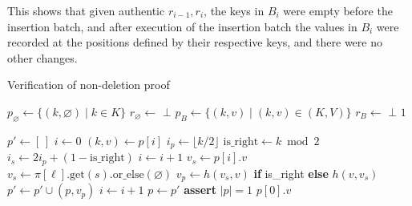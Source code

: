 \documentclass[twocolumn]{article}
\begin{document}
This shows that given authentic $r_{i-1}, r_i$, the keys in $B_i$ were empty before the insertion batch, and after execution of the insertion batch the values in $B_i$ were recorded at the positions defined by their respective keys, and there were no other changes.


\begin{algorithm}[tb]
  \caption{Verification of non-deletion proof}\label{alg:verifynondeletion}
  \begin{algorithmic}[1]
      \State   {}
      \State   {}
      \State $p_\varnothing \gets \{(k, \varnothing) \mid k \in K\}$ 
      \State $r_\varnothing \gets$ 
        \State \Return $\bot$
      \EndIf
      \State {}
      \State $p_B \gets \{(k, v) \mid (k,v) \in (K, V)\}$
      \State $r_B \gets$ 
        \State \Return $\bot$
      \EndIf
      \State \Return $1$ 
    \EndFunction

        \State $p' \gets [\,]$
        \State $i \gets 0$
          \State $(k, v) \gets p[i]$
          \State $i_p \gets \lfloor k / 2 \rfloor$ 
          \State $\text{is\_right} \gets k \bmod 2$
          \State $i_s \gets 2i_p + (1 - \text{is\_right})$ 
            \State        {}
            \State $i \gets i + 1$ 
            \State $v_s \gets p[i].v$ 
          \Else
            \State $v_s \gets \pi[\ell].\text{get}(s).\text{or\_else}( \varnothing)$
          \EndIf
          \State $v_p \gets h(v_s, v)$ \textbf{if} is\_right \textbf{else} $h(v, v_s)$
          \State $p' \gets p' \cup (p, v_p)$
          \State $i \gets i + 1$
        \EndWhile
        \State $p \gets p'$
      \EndFor
      \State \textbf{assert} $|p| = 1$ 
      \State \Return $p[0].v$ 
    \EndFunction
  \end{algorithmic}
\end{algorithm}
\end{document}
